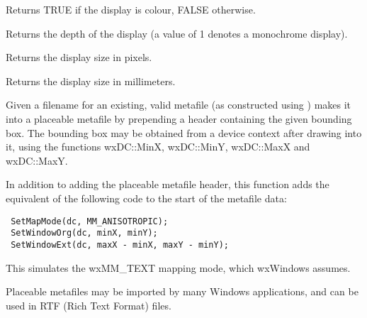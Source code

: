 

Returns TRUE if the display is colour, FALSE otherwise.



Returns the depth of the display (a value of 1 denotes a monochrome display).




Returns the display size in pixels.




Returns the display size in millimeters.

\label{wxmakemetafileplaceable}


Given a filename for an existing, valid metafile (as constructed using )
makes it into a placeable metafile by prepending a header containing the given
bounding box. The bounding box may be obtained from a device context after drawing
into it, using the functions wxDC::MinX, wxDC::MinY, wxDC::MaxX and wxDC::MaxY.

In addition to adding the placeable metafile header, this function adds
the equivalent of the following code to the start of the metafile data:

\begin{verbatim}
 SetMapMode(dc, MM_ANISOTROPIC);
 SetWindowOrg(dc, minX, minY);
 SetWindowExt(dc, maxX - minX, maxY - minY);
\end{verbatim}

This simulates the wxMM\_TEXT mapping mode, which wxWindows assumes.

Placeable metafiles may be imported by many Windows applications, and can be
used in RTF (Rich Text Format) files.


